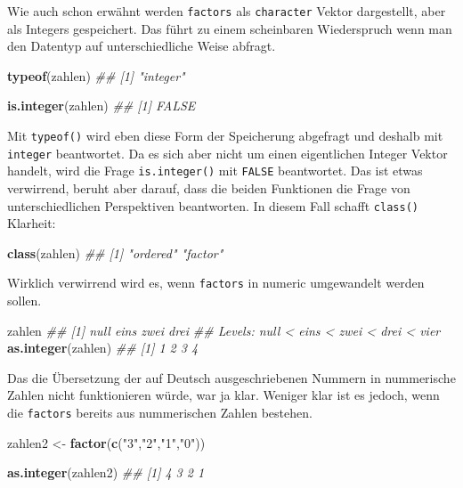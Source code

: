 \documentclass[]{book}
\newenvironment{Shaded}{\begin{snugshade}}{\end{snugshade}}
\newcommand{\CommentTok}[1]{\textcolor[rgb]{0.56,0.35,0.01}{\textit{#1}}}
\newcommand{\KeywordTok}[1]{\textcolor[rgb]{0.13,0.29,0.53}{\textbf{#1}}}
\newcommand{\NormalTok}[1]{#1}
\newcommand{\StringTok}[1]{\textcolor[rgb]{0.31,0.60,0.02}{#1}}
\begin{document}
Wie auch schon erwähnt werden \texttt{factors} als \texttt{character} Vektor dargestellt, aber als Integers gespeichert. Das führt zu einem scheinbaren Wiederspruch wenn man den Datentyp auf unterschiedliche Weise abfragt.

\begin{Shaded}
\begin{Highlighting}[]
\KeywordTok{typeof}\NormalTok{(zahlen)}
\CommentTok{## [1] "integer"}

\KeywordTok{is.integer}\NormalTok{(zahlen)}
\CommentTok{## [1] FALSE}
\end{Highlighting}
\end{Shaded}

Mit \texttt{typeof()} wird eben diese Form der Speicherung abgefragt und deshalb mit \texttt{integer} beantwortet. Da es sich aber nicht um einen eigentlichen Integer Vektor handelt, wird die Frage \texttt{is.integer()} mit \texttt{FALSE} beantwortet. Das ist etwas verwirrend, beruht aber darauf, dass die beiden Funktionen die Frage von unterschiedlichen Perspektiven beantworten. In diesem Fall schafft \texttt{class()} Klarheit:

\begin{Shaded}
\begin{Highlighting}[]
\KeywordTok{class}\NormalTok{(zahlen)}
\CommentTok{## [1] "ordered" "factor"}
\end{Highlighting}
\end{Shaded}

Wirklich verwirrend wird es, wenn \texttt{factors} in numeric umgewandelt werden sollen.

\begin{Shaded}
\begin{Highlighting}[]
\NormalTok{zahlen}
\CommentTok{## [1] null eins zwei drei}
\CommentTok{## Levels: null < eins < zwei < drei < vier}
\KeywordTok{as.integer}\NormalTok{(zahlen)}
\CommentTok{## [1] 1 2 3 4}
\end{Highlighting}
\end{Shaded}

Das die Übersetzung der auf Deutsch ausgeschriebenen Nummern in nummerische Zahlen nicht funktionieren würde, war ja klar. Weniger klar ist es jedoch, wenn die \texttt{factors} bereits aus nummerischen Zahlen bestehen.

\begin{Shaded}
\begin{Highlighting}[]
\NormalTok{zahlen2 <-}\StringTok{ }\KeywordTok{factor}\NormalTok{(}\KeywordTok{c}\NormalTok{(}\StringTok{"3"}\NormalTok{,}\StringTok{"2"}\NormalTok{,}\StringTok{"1"}\NormalTok{,}\StringTok{"0"}\NormalTok{))}

\KeywordTok{as.integer}\NormalTok{(zahlen2)}
\CommentTok{## [1] 4 3 2 1}
\end{Highlighting}
\end{Shaded}
\end{document}
